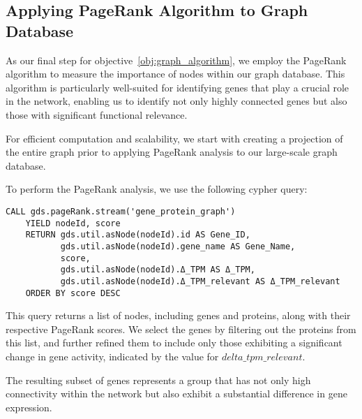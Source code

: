\subsection{Applying PageRank Algorithm to Graph Database} \label{subsec:graph_database_algo}

As our final step for objective~\ref{obj:graph_algorithm},
we employ the PageRank algorithm to measure the importance of nodes within our graph database.
This algorithm is particularly well-suited for identifying genes that play a crucial role in the network,
enabling us to identify not only highly connected genes but also those with significant functional relevance.

For efficient computation and scalability,
we start with creating a projection of the entire graph prior to applying PageRank analysis to our large-scale graph database.

To perform the PageRank analysis, we use the following cypher query:
\begin{lstlisting}[language=Cypher, label={lst:pagerank}]
    CALL gds.pageRank.stream('gene_protein_graph')
    YIELD nodeId, score
    RETURN gds.util.asNode(nodeId).id AS Gene_ID,
           gds.util.asNode(nodeId).gene_name AS Gene_Name,
           score,
           gds.util.asNode(nodeId).Δ_TPM AS Δ_TPM,
           gds.util.asNode(nodeId).Δ_TPM_relevant AS Δ_TPM_relevant
    ORDER BY score DESC
\end{lstlisting}

This query returns a list of nodes, including genes and proteins, along with their respective PageRank scores.
We select the genes by filtering out the proteins from this list, and
further refined them to include only those exhibiting a significant change in gene activity,
indicated by the value for $delta\_tpm\_relevant$.

The resulting subset of genes represents a group that has not only high connectivity
within the network but also exhibit a substantial difference in gene expression.\\
